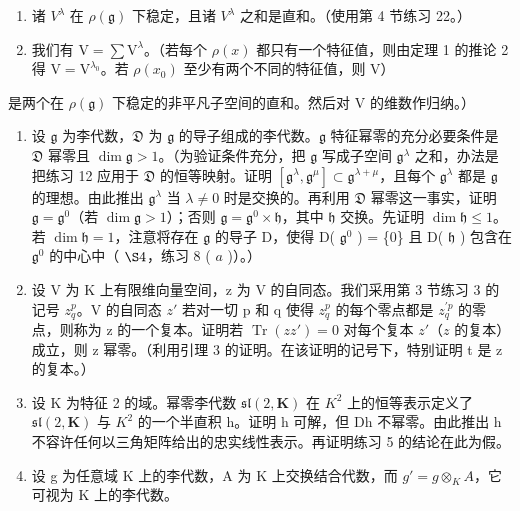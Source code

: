 \begin{enumerate}
\def\labelenumi{(\alph{enumi})}
\item
  诸 \(V^{\lambda}\) 在 \(\rho(\mathfrak{g})\) 下稳定，且诸 \(V^{\lambda}\) 之和是直和。（使用第 4 节练习 22。）
\item
  我们有 \(\mathrm{V} = \sum \mathrm{V}^{\lambda}\)。（若每个 \(\rho(x)\) 都只有一个特征值，则由定理 1 的推论 2 得 \(\mathrm{V} = \mathrm{V}^{\lambda_0}\)。若 \(\rho(x_0)\) 至少有两个不同的特征值，则 \(\mathrm{V}\)）
\end{enumerate}

是两个在 \(\rho(\mathfrak{g})\) 下稳定的非平凡子空间的直和。然后对 V 的维数作归纳。）

\begin{enumerate}
\def\labelenumi{\arabic{enumi}.}
\setcounter{enumi}{12}
\item
  设 \(\mathfrak{g}\) 为李代数，\(\mathfrak{D}\) 为 \(\mathfrak{g}\) 的导子组成的李代数。\(\mathfrak{g}\) 特征幂零的充分必要条件是 \(\mathfrak{D}\) 幂零且 \(\dim \mathfrak{g} > 1\)。（为验证条件充分，把 \(\mathfrak{g}\) 写成子空间 \(\mathfrak{g}^{\lambda}\) 之和，办法是把练习 12 应用于 \(\mathfrak{D}\) 的恒等映射。证明 \([\mathfrak{g}^{\lambda}, \mathfrak{g}^{\mu}] \subset \mathfrak{g}^{\lambda + \mu}\)，且每个 \(\mathfrak{g}^{\lambda}\) 都是 \(\mathfrak{g}\) 的理想。由此推出 \(\mathfrak{g}^{\lambda}\) 当 \(\lambda \neq 0\) 时是交换的。再利用 \(\mathfrak{D}\) 幂零这一事实，证明 \(\mathfrak{g} = \mathfrak{g}^{0}\)（若 \(\dim \mathfrak{g} > 1\)）；否则 \(\mathfrak{g} = \mathfrak{g}^{0} \times \mathfrak{h}\)，其中 \(\mathfrak{h}\) 交换。先证明 \(\dim \mathfrak{h} \leqslant 1\)。若 \(\dim \mathfrak{h} = 1\)，注意将存在 \(\mathfrak{g}\) 的导子 D，使得 D( \(\mathfrak{g}^{0}\) ) = \{0\} 且 D( \(\mathfrak{h}\) ) 包含在 \(\mathfrak{g}^{0}\) 的中心中（ \(\S 4\)，练习 8 ( \(a\) )）。）
\item
  设 V 为 K 上有限维向量空间，z 为 V 的自同态。我们采用第 3 节练习 3 的记号 \(z_{q}^{p}\)。V 的自同态 \(z'\) 若对一切 p 和 q 使得 \(z_{q}^{p}\) 的每个零点都是 \(z_{q}^{\prime p}\) 的零点，则称为 z 的一个复本。证明若 \(\operatorname{Tr}(zz') = 0\) 对每个复本 \(z'\)（\(z\) 的复本）成立，则 z 幂零。（利用引理 3 的证明。在该证明的记号下，特别证明 t 是 z 的复本。）
\item
  设 K 为特征 2 的域。幂零李代数 \(\mathfrak{sl}(2,\mathbf{K})\) 在 \(K^{2}\) 上的恒等表示定义了 \(\mathfrak{sl}(2,\mathbf{K})\) 与 \(K^{2}\) 的一个半直积 h。证明 h 可解，但 Dh 不幂零。由此推出 h 不容许任何以三角矩阵给出的忠实线性表示。再证明练习 5 的结论在此为假。
\item
  设 g 为任意域 K 上的李代数，A 为 K 上交换结合代数，而 \(g' = g \otimes_{K} A\)，它可视为 K 上的李代数。
\end{enumerate}

